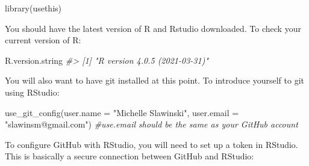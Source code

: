 \documentclass[
]{article}
\newenvironment{Shaded}{\begin{snugshade}}{\end{snugshade}}
\newcommand{\AttributeTok}[1]{\textcolor[rgb]{0.77,0.63,0.00}{#1}}
\newcommand{\CommentTok}[1]{\textcolor[rgb]{0.56,0.35,0.01}{\textit{#1}}}
\newcommand{\FunctionTok}[1]{\textcolor[rgb]{0.00,0.00,0.00}{#1}}
\newcommand{\NormalTok}[1]{#1}
\newcommand{\StringTok}[1]{\textcolor[rgb]{0.31,0.60,0.02}{#1}}
\begin{document}
\begin{Shaded}
\begin{Highlighting}[]
\FunctionTok{library}\NormalTok{(usethis)}
\end{Highlighting}
\end{Shaded}

You should have the latest version of R and Rstudio downloaded. To check
your current version of R:

\begin{Shaded}
\begin{Highlighting}[]
\NormalTok{R.version.string}
\CommentTok{\#\textgreater{} [1] "R version 4.0.5 (2021{-}03{-}31)"}
\end{Highlighting}
\end{Shaded}

You will also want to have git installed at this point. To introduce
yourself to git using RStudio:

\begin{Shaded}
\begin{Highlighting}[]
\FunctionTok{use\_git\_config}\NormalTok{(}\AttributeTok{user.name =} \StringTok{"Michelle Slawinski"}\NormalTok{, }\AttributeTok{user.email =} \StringTok{"slawinsm@gmail.com"}\NormalTok{) }
  \CommentTok{\#use.email should be the same as your GitHub account}
\end{Highlighting}
\end{Shaded}

To configure GitHub with RStudio, you will need to set up a token in
RStudio. This is basically a secure connection between GitHub and
RStudio:
\end{document}
